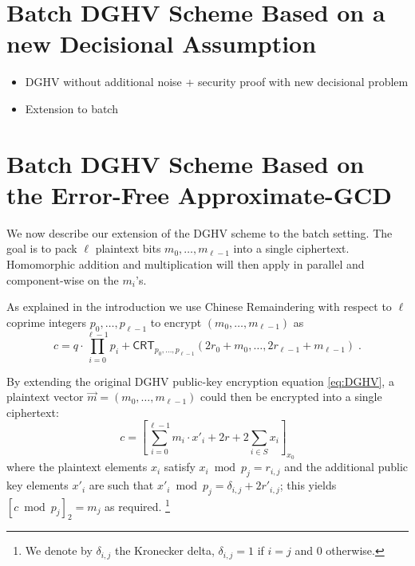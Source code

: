 \documentclass[11pt]{llncs}
\newcommand*{\crt}{\ensuremath{\mathsf{CRT}}}
\begin{document}
\section{Batch DGHV Scheme Based on a new Decisional Assumption}\label{sec:batch-decisional}

\begin{itemize}
  \item DGHV without additional noise + security proof with new decisional problem
  \item Extension to batch

\end{itemize}


\section{Batch DGHV Scheme Based on the Error-Free Approximate-GCD}\label{sec:batch-error-free}


We now describe our extension of the DGHV scheme to the batch setting. The goal is to
pack $\ell$ plaintext bits $m_0,\ldots,m_{\ell-1}$ into a single ciphertext. 
Homomorphic addition and multiplication will then apply in parallel
and component-wise on the $m_i$'s. 

As explained in the introduction we use Chinese Remaindering with respect
to $\ell$ coprime integers $p_0,\ldots,p_{\ell-1}$ to encrypt
$(m_0,\ldots,m_{\ell-1})$ as
\[
c = q\cdot \prod\limits_{i=0}^{\ell-1} p_i +
    \crt_{p_0,\ldots,p_{\ell-1}}(2r_0+m_0,\ldots,2r_{\ell-1}+m_{\ell-1})\;. 
\]

By extending the original DGHV public-key encryption equation
\eqref{eq:DGHV}, a plaintext vector  $\vec m=(m_0,\ldots,m_{\ell-1})$
could then be encrypted into a single ciphertext:
\begin{equation}
\label{eq:cbatch}
c = \left[\sum_{i=0}^{\ell-1} m_i\cdot x'_i + 2r +
  2\sum\limits_{i\in S} x_i\right]_{x_0}
\end{equation}
where the plaintext elements $x_i$ satisfy $x_i \bmod p_j=r_{i,j}$ and
the additional public key elements $x'_i$ are such that $x'_i\bmod
p_j=\delta_{i,j}+2r'_{i,j}$; this yields $[c\bmod p_j]_2=m_j$ as
required.%
\footnote{We denote by $\delta_{i,j}$ the Kronecker delta,
$\delta_{i,j}=1$ if $i=j$ and $0$ otherwise.}
\end{document}
